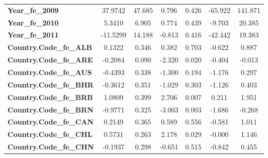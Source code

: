 \begin{center}
\begin{tabular}{lcccccc}
\textbf{Year\_fe\_2009}                                            &      37.9742  &       47.685     &     0.796  &         0.426        &      -65.922    &      141.871     \\
\textbf{Year\_fe\_2010}                                            &       5.3410  &        6.905     &     0.774  &         0.439        &       -9.703    &       20.385     \\
\textbf{Year\_fe\_2011}                                            &     -11.5299  &       14.188     &    -0.813  &         0.416        &      -42.442    &       19.383     \\
\textbf{Country.Code\_fe\_ALB}                                     &       0.1322  &        0.346     &     0.382  &         0.703        &       -0.622    &        0.887     \\
\textbf{Country.Code\_fe\_ARE}                                     &      -0.2084  &        0.090     &    -2.320  &         0.020        &       -0.404    &       -0.013     \\
\textbf{Country.Code\_fe\_AUS}                                     &      -0.4393  &        0.338     &    -1.300  &         0.194        &       -1.176    &        0.297     \\
\textbf{Country.Code\_fe\_BHR}                                     &      -0.3612  &        0.351     &    -1.029  &         0.303        &       -1.126    &        0.403     \\
\textbf{Country.Code\_fe\_BRB}                                     &       1.0809  &        0.399     &     2.706  &         0.007        &        0.211    &        1.951     \\
\textbf{Country.Code\_fe\_BRN}                                     &      -0.9771  &        0.325     &    -3.003  &         0.003        &       -1.686    &       -0.268     \\
\textbf{Country.Code\_fe\_CAN}                                     &       0.2149  &        0.365     &     0.589  &         0.556        &       -0.581    &        1.011     \\
\textbf{Country.Code\_fe\_CHL}                                     &       0.5731  &        0.263     &     2.178  &         0.029        &       -0.000    &        1.146     \\
\textbf{Country.Code\_fe\_CHN}                                     &      -0.1937  &        0.298     &    -0.651  &         0.515        &       -0.842    &        0.455     \\

\end{tabular}
\end{center}

